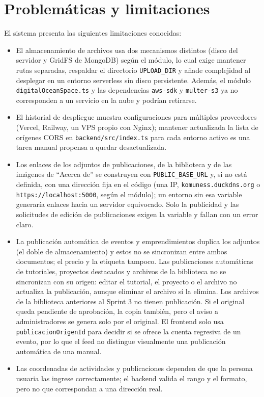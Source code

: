 \section{Problemáticas y limitaciones}
El sistema presenta las siguientes limitaciones conocidas:
\begin{itemize}
    \item El almacenamiento de archivos usa dos mecanismos distintos (disco del servidor y GridFS de MongoDB) según el módulo, lo cual exige mantener rutas separadas, respaldar el directorio \texttt{UPLOAD\_DIR} y añade complejidad al desplegar en un entorno serverless sin disco persistente. Además, el módulo \texttt{digitalOceanSpace.ts} y las dependencias \texttt{aws-sdk} y \texttt{multer-s3} ya no corresponden a un servicio en la nube y podrían retirarse.
    \item El historial de despliegue muestra configuraciones para múltiples proveedores (Vercel, Railway, un VPS propio con Nginx); mantener actualizada la lista de orígenes CORS en \texttt{backend/src/index.ts} para cada entorno activo es una tarea manual propensa a quedar desactualizada.
    \item Los enlaces de los adjuntos de publicaciones, de la biblioteca y de las imágenes de ``Acerca de'' se construyen con \texttt{PUBLIC\_BASE\_URL} y, si no está definida, con una dirección fija en el código (una IP, \texttt{komuness.duckdns.org} o \texttt{https://localhost:5000}, según el módulo); un entorno sin esa variable generaría enlaces hacia un servidor equivocado. Solo la publicidad y las solicitudes de edición de publicaciones exigen la variable y fallan con un error claro.
    \item La publicación automática de eventos y emprendimientos duplica los adjuntos (el doble de almacenamiento) y estos no se sincronizan entre ambos documentos; el precio y la etiqueta tampoco. Las publicaciones automáticas de tutoriales, proyectos destacados y archivos de la biblioteca no se sincronizan con su origen: editar el tutorial, el proyecto o el archivo no actualiza la publicación, aunque eliminar el archivo sí la elimina. Los archivos de la biblioteca anteriores al Sprint 3 no tienen publicación. Si el original queda pendiente de aprobación, la copia también, pero el aviso a administradores se genera solo por el original. El frontend solo usa \texttt{publicacionOrigenId} para decidir si se ofrece la cuenta regresiva de un evento, por lo que el feed no distingue visualmente una publicación automática de una manual.
    \item Las coordenadas de actividades y publicaciones dependen de que la persona usuaria las ingrese correctamente; el backend valida el rango y el formato, pero no que correspondan a una dirección real.

\end{itemize}
